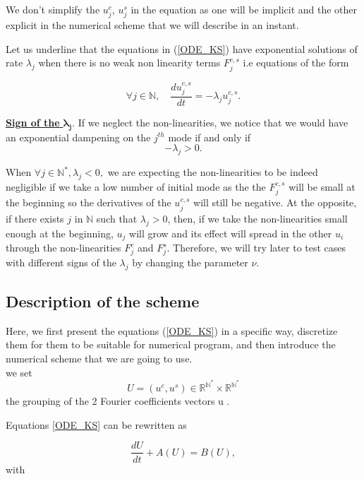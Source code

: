 \documentclass[12pt]{article}
\begin{document}
We don't simplify the $u_j^c$, $u_j^s$ in the equation as one will be implicit and the other explicit in the 
 numerical scheme that we will describe in an instant. 

Let us underline that the equations in (\ref{ODE_KS}) have exponential solutions of rate $\lambda_j$ when there is no weak non linearity 
terms $F_j^{c,s}$ i.e equations of the form 

\begin{equation}\label{KS_exponential_ODE}
    \forall j\in \mathbb{N}, \quad \frac{du_j^{c,s}}{dt} = -\lambda_ju_j^{c,s}.
\end{equation}

\underline{\textbf{Sign of the } $\boldsymbol{\lambda_j}.$} If we neglect the non-linearities, we notice that we would have an exponential
 dampening on the $j^{th}$ mode if and only if $$-\lambda_j > 0. $$

When $\forall j \in \mathbb{N}^*,\lambda_j <0,$ we are expecting the non-linearities to be indeed negligible if we take a low number of 
initial mode as the the $F_j^{c,s}$ will be small at the beginning so the derivatives of the $u_j^{c,s}$ will still be negative. 
At the opposite, if there exists $j$ in  $\mathbb{N}$ such that $\lambda_j >0$, then, if we take the non-linearities small enough at the beginning,
$u_j$ will grow and its effect will spread in the other $u_i$ through the non-linearities $F_j^c$ and $F_j^s$. Therefore, we will try 
later to test cases with different signs of the $\lambda_j$ by changing the parameter $\nu$.



\subsection{Description of the scheme}

Here, we first present the equations (\ref{ODE_KS}) in a specific way, discretize them for them to be suitable for numerical program, 
and then introduce the numerical scheme that we are going to use. 
\\

we set 
\begin{equation}
    U = (u^c, u^s) \in \mathbb{R}^{\mathbb{N}^*} \times\mathbb{R}^{\mathbb{N}^*}
\end{equation} the grouping of the 2 Fourier coefficients vectors u .

Equations \eqref{ODE_KS} can be rewritten as 

\begin{equation}
    \frac{dU}{dt} + A(U) = B(U),
\end{equation}
with 
\end{document}
